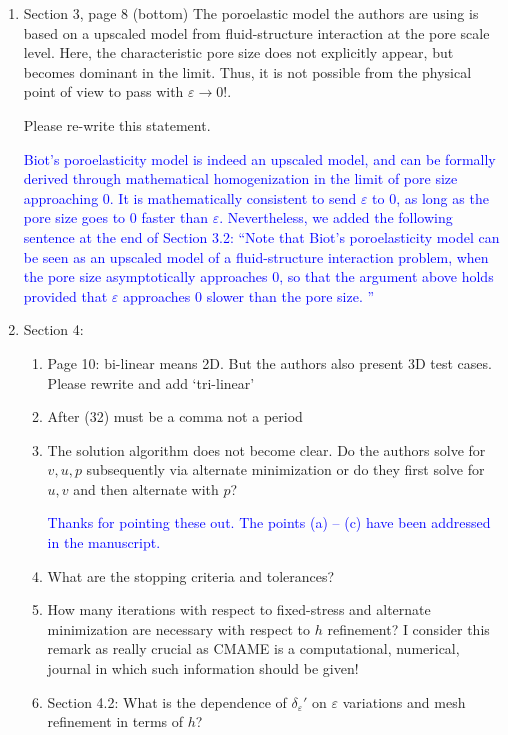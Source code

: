 \documentclass{article}
\newcommand{\AuthCom}[1]{\textcolor{blue}{#1}}
\begin{document}
\begin{enumerate}
\begin{enumerate}
\end{enumerate}

\item Section 3, page 8 (bottom)
The poroelastic model the authors are using is based on a upscaled model from fluid-structure interaction at the pore scale level. Here, the characteristic pore size does not explicitly appear, but becomes dominant in the limit.
Thus, it is not possible from the physical point of view to pass with $\varepsilon\to 0$!. 

Please re-write this statement.

\AuthCom{Biot's poroelasticity model is indeed an upscaled model, and can be formally derived through mathematical homogenization in the limit of pore size approaching 0. It is mathematically consistent to send $\varepsilon$ to 0, as long as the pore size goes to 0 faster than $\varepsilon$.
%
Nevertheless, we added the following sentence at the end of Section 3.2: ``Note that Biot's poroelasticity model can be seen as an upscaled model of a fluid-structure interaction problem, when the pore size asymptotically approaches 0, so that the argument above holds provided that $\varepsilon$ approaches 0 slower than the pore size. ''
}
\item Section 4:
\begin{enumerate}
	\item Page 10: bi-linear means 2D. But the authors also present 3D test cases. Please rewrite and add `tri-linear'
	\item After (32) must be a comma not a period

	\item The solution algorithm does not become clear. Do the authors solve for $v,u,p$ subsequently via alternate minimization or do they first solve for $u,v$ and then alternate with $p$?

    \AuthCom{Thanks for pointing these out. The points (a) -- (c) have been addressed in the manuscript.}

	\item What are the stopping criteria and tolerances? 

	\item How many iterations with respect to fixed-stress and alternate minimization are necessary with respect to $h$ refinement?
	I consider this remark as really crucial as CMAME is a computational, numerical, journal in which such information should be given!

	\item Section 4.2: What is the dependence of $\delta_{\varepsilon}'$ on $\varepsilon$ variations and mesh refinement in terms of $h$?


\end{enumerate}
\end{enumerate}
\end{document}
